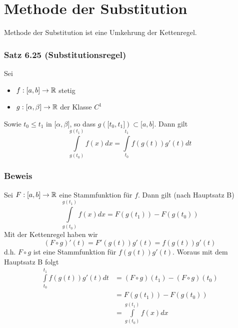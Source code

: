 \section{Methode der Substitution}
Methode der Substitution ist eine Umkehrung der Kettenregel.
\subsubsection*{Satz 6.25 (Substitutionsregel)}
Sei
\begin{itemize}
\item $f:\lbrack a,b\rbrack\to\mathbb{R}$ stetig
\item $g:\lbrack\alpha,\beta\rbrack\to\mathbb{R}$ der Klasse $C^1$
\end{itemize}
Sowie $t_0\leq t_1$ in $\lbrack\alpha,\beta\rbrack$, so dass $g\left(\lbrack t_0, t_1\rbrack\right)\subset\lbrack a,b\rbrack$.
Dann gilt
\[\int\limits_{g({t_0})}^{g({t_1})} {f(x)dx = \int\limits_{{t_0}}^{{t_1}} {f\left( {g\left( t \right)} \right)g'\left( t \right)dt} } \]

\subsubsection*{Beweis}
Sei $F:\lbrack a,b\rbrack\to\mathbb{R}$ eine Stammfunktion für $f$. Dann gilt (nach Hauptsatz B)
\[\int\limits_{g({t_0})}^{g({t_1})} {f(x)dx = F\left( {g({t_1})} \right)}  - F\left( {g({t_0})} \right)\]
Mit der Kettenregel haben wir
\[(F \circ g)'(t) = F'(g(t))g'(t) = f(g(t))g'(t)\]
d.h. $F\circ g$ ist eine Stammfunktion für $f(g(t))g'(t)$. Woraus mit dem Hauptsatz B folgt
\begin{align*}
\int\limits_{{t_0}}^{{t_1}} {f\left( {g(t)} \right)} g'(t)dt &=\left( {F \circ g} \right)({t_1}) - \left( {F \circ g} \right)({t_0})\\
 &=F\left( {g({t_1})} \right) - F\left( {g({t_0})} \right)\\
 &=\int\limits_{g({t_0})}^{g({t_1})} {f(x)dx}
\end{align*}

